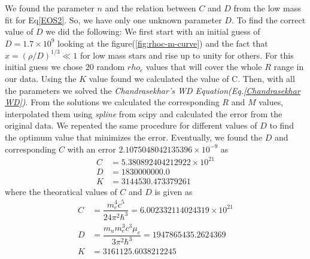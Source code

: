 \documentclass[aps,twocolumn,showpacs,preprintnumbers,nofootinbib,prl,superscriptaddress,groupedaddress]{revtex4-1}
\begin{document}
We found the parameter $n$ and the relation between $C$ and $D$ from the low mass fit for Eq\ref{EOS2}. So, we have only one unknown parameter $D$. To find the correct value of $D$ we did the following: We first start with an initial guess of $D = 1.7\times 10^9$ looking at the figure(\ref{fig:rhoc-m-curve}) and the fact that $x = (\rho/D)^{1/3} \ll 1$ for low mass stars and rise up to unity for others. For this initial guess we chose 20 random $rho_c$ values that will cover the whole $R$ range in our data. Using the $K$ value found we calculated the value of C. Then, with all the parameters we solved the \textit{Chandrasekhar's WD Equation(Eq.\ref{Chandrasekhar WD})}. From the solutions we calculated the corresponding $R$ and $M$ values, interpolated them using \textit{spline} from scipy and calculated the error from the original data. We repeated the same procedure for different values of $D$ to find the optimum value that minimizes the error. Eventually, we found the $ D $ and corresponding $ C $ with an error $ 2.1075048042135396\times10^{-9} $ as
\begin{align}
	C &= 5.380892404212922\times 10^{21}  \\
	D &= 1830000000.0\nonumber\\
	K &= 3144530.473379261\nonumber
\end{align} 
where the theoratical values of $ C $ and $ D $ is given as
\begin{align}\label{theoratical}
	C &= \dfrac{m_e^4c^5}{24\pi^2\hbar^3} = 6.002332114024319\times 10^{21}\\
	D &= \dfrac{m_u m_e^3c^3\mu_e}{3\pi^2 \hbar^3} = 1947865435.2624369\nonumber\\
	K &= 3161125.6038212245\nonumber
\end{align}
\end{document}
